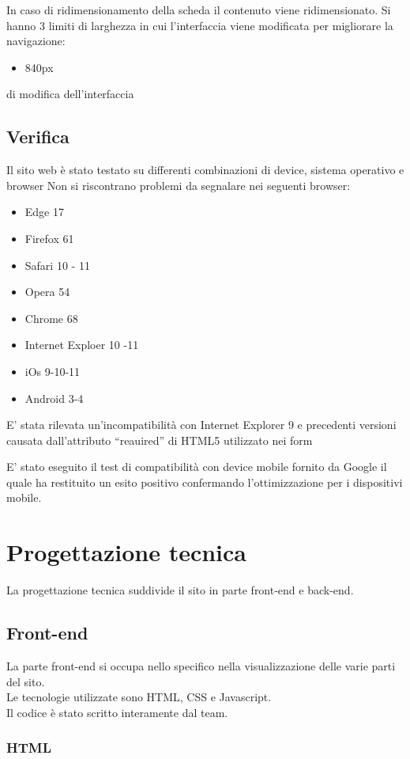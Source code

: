 In caso di ridimensionamento della scheda il contenuto viene ridimensionato.
Si hanno 3 limiti di larghezza in cui l'interfaccia viene modificata per migliorare la navigazione:
\begin{itemize}
	\item 840px
\end{itemize}di modifica dell'interfaccia

\subsection{Verifica}
Il sito web è stato testato su differenti combinazioni di device, sistema operativo e browser 
Non si riscontrano problemi da segnalare nei seguenti browser:
\begin{itemize}
	\item Edge 17
	\item Firefox 61
	\item Safari 10 -  11
	\item Opera 54
	\item Chrome 68
	\item Internet Exploer 10 -11
	\item iOs 9-10-11
	\item Android 3-4
\end{itemize}	

E’ stata rilevata un’incompatibilità con Internet Explorer 9 e precedenti versioni causata dall’attributo “reauired” di HTML5 utilizzato nei form

E’ stato eseguito il test di compatibilità con device mobile fornito da Google il quale ha restituito un esito positivo confermando l’ottimizzazione per i dispositivi mobile.

\section{Progettazione tecnica}
La progettazione tecnica suddivide il sito in parte front-end e back-end.
\subsection{Front-end}

La parte front-end si occupa nello specifico nella visualizzazione delle varie parti del sito.\\
Le tecnologie utilizzate sono HTML, CSS e Javascript.\\
Il codice è stato scritto interamente dal team.

\subsubsection{HTML}

